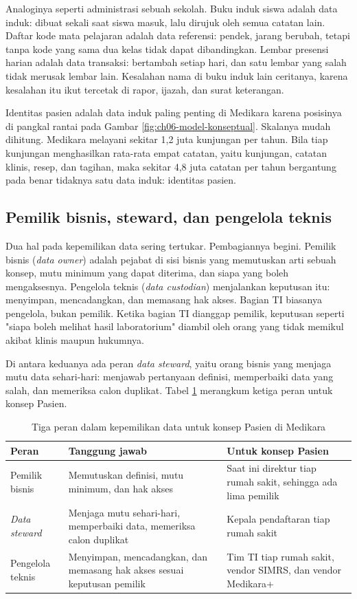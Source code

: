 Analoginya seperti administrasi sebuah sekolah. Buku induk siswa adalah data
induk: dibuat sekali saat siswa masuk, lalu dirujuk oleh semua catatan lain.
Daftar kode mata pelajaran adalah data referensi: pendek, jarang berubah, tetapi
tanpa kode yang sama dua kelas tidak dapat dibandingkan. Lembar presensi harian
adalah data transaksi: bertambah setiap hari, dan satu lembar yang salah tidak
merusak lembar lain. Kesalahan nama di buku induk lain ceritanya, karena
kesalahan itu ikut tercetak di rapor, ijazah, dan surat keterangan.

Identitas pasien adalah data induk paling penting di Medikara karena posisinya
di pangkal rantai pada Gambar \ref{fig:ch06-model-konseptual}. Skalanya mudah
dihitung. Medikara melayani sekitar 1,2 juta kunjungan per tahun. Bila tiap
kunjungan menghasilkan rata-rata empat catatan, yaitu kunjungan, catatan
klinis, resep, dan tagihan, maka sekitar 4,8 juta catatan per tahun bergantung
pada benar tidaknya satu data induk: identitas pasien.

\subsection*{Pemilik bisnis, steward, dan pengelola teknis}

Dua hal pada kepemilikan data sering tertukar. Pembagiannya begini. Pemilik
bisnis (\textit{data owner}) adalah pejabat di sisi bisnis yang memutuskan arti
sebuah konsep, mutu minimum yang dapat diterima, dan siapa yang boleh
mengaksesnya. Pengelola teknis (\textit{data custodian}) menjalankan keputusan
itu: menyimpan, mencadangkan, dan memasang hak akses. Bagian TI biasanya
pengelola, bukan pemilik. Ketika bagian TI dianggap pemilik, keputusan
seperti "siapa boleh melihat hasil laboratorium" diambil oleh orang yang tidak
memikul akibat klinis maupun hukumnya.

Di antara keduanya ada peran \textit{data steward}, yaitu orang bisnis yang
menjaga mutu data sehari-hari: menjawab pertanyaan definisi, memperbaiki data
yang salah, dan memeriksa calon duplikat. Tabel \ref{tab:ch06-peran-data}
merangkum ketiga peran untuk konsep Pasien.

\begin{table}[!htb]
  \centering
  \caption{Tiga peran dalam kepemilikan data untuk konsep Pasien di Medikara}
  \label{tab:ch06-peran-data}
  \begin{tabularx}{\textwidth}{lXX}
    \hline
    \textbf{Peran} & \textbf{Tanggung jawab} & \textbf{Untuk konsep Pasien} \\
    \hline
    Pemilik bisnis & Memutuskan definisi, mutu minimum, dan hak akses &
      Saat ini direktur tiap rumah sakit, sehingga ada lima pemilik \\
    \hline
    \textit{Data steward} & Menjaga mutu sehari-hari, memperbaiki data, memeriksa
      calon duplikat & Kepala pendaftaran tiap rumah sakit \\
    \hline
    Pengelola teknis & Menyimpan, mencadangkan, dan memasang hak akses sesuai
      keputusan pemilik & Tim TI tiap rumah sakit, vendor SIMRS, dan vendor
      Medikara+ \\
    \hline
  \end{tabularx}
\end{table}

